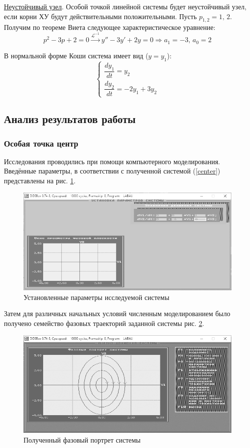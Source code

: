 	\underline{Неустойчивый узел}. Особой точкой линейной системы будет неустойчивый узел, если корни ХУ будут действительными положительными. Пусть $p_{1,2} = 1,\,2$. Получим по теореме Виета следующее характеристическое уравнение:
	\begin{equation*}
		p^2-3p+2 = 0 \stackrel{\mathcal{L}^{-1}}{\to} y''-3y'+2y = 0 \Rightarrow a_1=-3,\,a_0=2
	\end{equation*}

	В нормальной форме Коши система имеет вид ($y=y_1$):
	\begin{equation}
		\begin{cases*}
			\dfrac{dy_1}{dt} = y_2 \\[0.5em] 
			\dfrac{dy_2}{dt} = -2y_1+3y_2
		\end{cases*}
		\label{uzel}
	\end{equation}

	\subsection{Анализ результатов работы}
	\subsubsection{Особая точка центр}
	
	Исследования проводились при помощи компьютерного моделирования. Введённые параметры, в соответствии с полученной системой (\ref{center}) представлены на рис. \ref{params1}.
	
	\begin{figure}[h]
		\centering\includegraphics[width=.7\textwidth,trim={300px 190px 20px 33px},clip]{Центр/Параметры.png}
		\caption{Установленные параметры исследуемой системы}
		\label{params1}
	\end{figure}

	Затем для различных начальных условий численным моделированием было получено семейство фазовых траекторий заданной системы рис. \ref{portret1}.
	
	\begin{figure}[h]
		\centering\includegraphics[width=.6\textwidth,trim={0 0 165px 20px},clip]{Центр/Портрет.png}
		\caption{Полученный фазовый портрет системы}
		\label{portret1}
	\end{figure}

